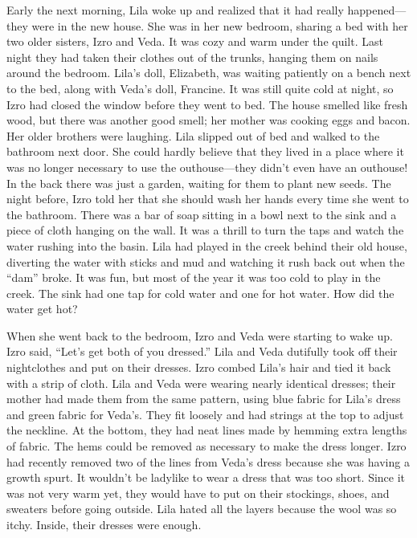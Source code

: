 \documentclass[
  letterpaper,
]{book}
\begin{document}
Early the next morning, Lila woke up and realized that it had really
happened---they were in the new house. She was in her new bedroom,
sharing a bed with her two older sisters, Izro and Veda. It was cozy and
warm under the quilt. Last night they had taken their clothes out of the
trunks, hanging them on nails around the bedroom. Lila's doll,
Elizabeth, was waiting patiently on a bench next to the bed, along with
Veda's doll, Francine. It was still quite cold at night, so Izro had
closed the window before they went to bed. The house smelled like fresh
wood, but there was another good smell; her mother was cooking eggs and
bacon. Her older brothers were laughing. Lila slipped out of bed and
walked to the bathroom next door. She could hardly believe that they
lived in a place where it was no longer necessary to use the
outhouse---they didn't even have an outhouse! In the back there was just
a garden, waiting for them to plant new seeds. The night before, Izro
told her that she should wash her hands every time she went to the
bathroom. There was a bar of soap sitting in a bowl next to the sink and
a piece of cloth hanging on the wall. It was a thrill to turn the taps
and watch the water rushing into the basin. Lila had played in the creek
behind their old house, diverting the water with sticks and mud and
watching it rush back out when the ``dam'' broke. It was fun, but most
of the year it was too cold to play in the creek. The sink had one tap
for cold water and one for hot water. How did the water get hot?

When she went back to the bedroom, Izro and Veda were starting to wake
up. Izro said, ``Let's get both of you dressed.'' Lila and Veda
dutifully took off their nightclothes and put on their dresses. Izro
combed Lila's hair and tied it back with a strip of cloth. Lila and Veda
were wearing nearly identical dresses; their mother had made them from
the same pattern, using blue fabric for Lila's dress and green fabric
for Veda's. They fit loosely and had strings at the top to adjust the
neckline. At the bottom, they had neat lines made by hemming extra
lengths of fabric. The hems could be removed as necessary to make the
dress longer. Izro had recently removed two of the lines from Veda's
dress because she was having a growth spurt. It wouldn't be ladylike to
wear a dress that was too short. Since it was not very warm yet, they
would have to put on their stockings, shoes, and sweaters before going
outside. Lila hated all the layers because the wool was so itchy.
Inside, their dresses were enough.
\end{document}
